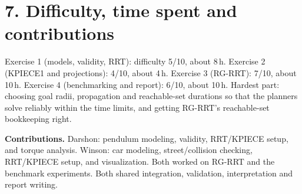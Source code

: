 \documentclass[10pt,letterpaper]{article}
\begin{document}
\section*{7. Difficulty, time spent and contributions}
Exercise 1 (models, validity, RRT): difficulty 5/10, about 8\,h.
Exercise 2 (KPIECE1 and projections): 4/10, about 4\,h.
Exercise 3 (RG-RRT): 7/10, about 10\,h.
Exercise 4 (benchmarking and report): 6/10, about 10\,h.
Hardest part: choosing goal radii, propagation and reachable-set durations so that the planners solve reliably
within the time limits, and getting RG-RRT's reachable-set bookkeeping right.

\textbf{Contributions.} Darshon: pendulum modeling, validity, RRT/KPIECE setup, and torque analysis. Winson: car modeling,
street/collision checking, RRT/KPIECE setup, and visualization. Both worked on RG-RRT and the benchmark experiments. Both shared
integration, validation, interpretation and report writing.
\end{document}
